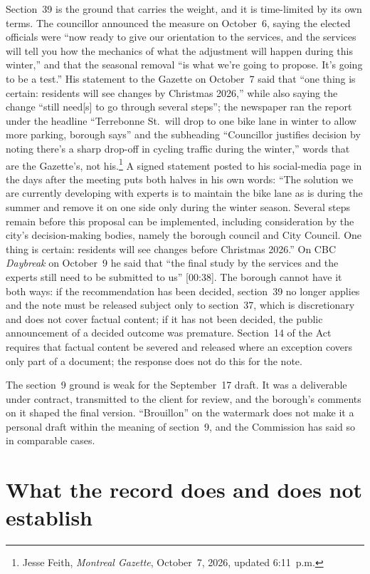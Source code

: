\documentclass[11pt,letterpaper]{article}
\begin{document}
Section~39 is the ground that carries the weight, and it is time-limited by
its own terms. The councillor announced the measure on October~6, saying
the elected officials were ``now ready to give our orientation to the
services, and the services will tell you how the mechanics of what the
adjustment will happen during this winter,'' and that the seasonal removal
``is what we're going to propose. It's going to be a test.'' His statement
to the Gazette on October~7 said that ``one thing is certain: residents
will see changes by Christmas 2026,'' while also saying the change ``still
need[s] to go through several steps''; the newspaper ran the report under
the headline ``Terrebonne St.~will drop to one bike lane in winter to
allow more parking, borough says'' and the subheading ``Councillor
justifies decision by noting there's a sharp drop-off in cycling traffic
during the winter,'' words that are the Gazette's, not his.\footnote{Jesse
Feith, \emph{Montreal Gazette}, October~7, 2026, updated 6:11~p.m.} A signed statement posted to his
social-media page in the days after the meeting puts both halves in his own
words: ``The solution we are currently developing with experts is to
maintain the bike lane as is during the summer and remove it on one side
only during the winter season. Several steps remain before this proposal
can be implemented, including consideration by the city's decision-making
bodies, namely the borough council and City Council. One thing is certain:
residents will see changes before Christmas 2026.'' On CBC \emph{Daybreak}
on October~9 he said that ``the final study by the services and the
experts still need to be submitted to us'' [00:38]. The borough cannot have it both ways: if the
recommendation has been decided, section~39 no longer applies and the note
must be released subject only to section~37, which is discretionary and
does not cover factual content; if it has not been decided, the public
announcement of a decided outcome was premature. Section~14 of the Act
requires that factual content be severed and released where an exception
covers only part of a document; the response does not do this for the note.

The section~9 ground is weak for the September~17 draft. It was a
deliverable under contract, transmitted to the client for review, and the
borough's comments on it shaped the final version. ``Brouillon'' on the
watermark does not make it a personal draft within the meaning of
section~9, and the Commission has said so in comparable cases.

\section{What the record does and does not establish}
\end{document}
